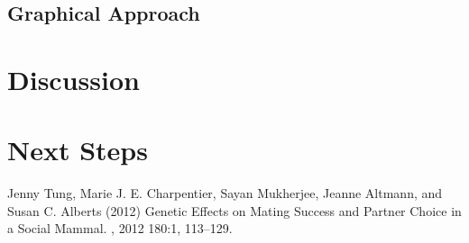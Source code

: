 \documentclass[twoside,twocolumn,paper=letter]{article}
\begin{document}
\subsection{Graphical Approach}


\section{Discussion}
\section{Next Steps}


\begin{thebibliography}{99} %

  Jenny Tung, Marie J. E. Charpentier, Sayan Mukherjee, Jeanne Altmann, and Susan C. Alberts (2012)
\newblock 
  Genetic Effects on Mating Success and Partner Choice in a Social Mammal.
, 2012 180:1, 113--129.
 
\end{thebibliography}

\end{document}
